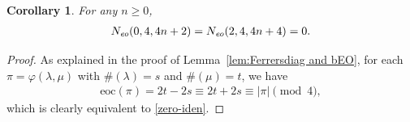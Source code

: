 \documentclass[12pt,reqno]{amsart}
\numberwithin{equation}{section}
\theoremstyle{plain}
\newtheorem{corollary}[theorem]{Corollary}
\theoremstyle{definition}
\begin{document}
\begin{corollary}\label{coro:eoc-refine}
For any $n\geq0$,
\begin{align}
N_{\emph{eo}}(0,4,4n+2)=N_{\emph{eo}}(2,4,4n+4)=0.\label{zero-iden}
\end{align}
\end{corollary}

\begin{proof}
As explained in the proof of Lemma~\ref{lem:Ferrersdiag and bEO}, for each $\pi=\varphi(\lambda,\mu)$ with
$\#(\lambda)=s$ and $\#(\mu)=t$, we have
\begin{align*}
\textrm{eoc}(\pi)=2t-2s\equiv 2t+2s\equiv |\pi|\pmod 4,
\end{align*}
which is clearly equivalent to \eqref{zero-iden}.
\end{proof}
\end{document}
